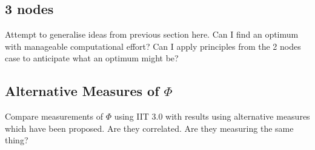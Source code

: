 \subsection{3 nodes}
Attempt to generalise ideas from previous section here. Can I find an optimum with manageable computational effort? Can I apply principles from the 2 nodes case to anticipate what an optimum might be?

\subsection{Alternative Measures of $\Phi$}
Compare measurements of $\Phi$ using IIT 3.0 with results using alternative measures which have been proposed. Are they correlated. Are they measuring the same thing?